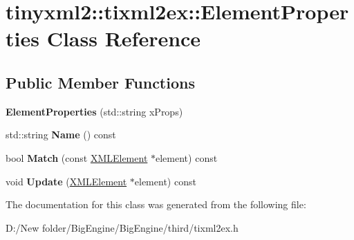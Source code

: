 \hypertarget{classtinyxml2_1_1tixml2ex_1_1_element_properties}{}\section{tinyxml2\+:\+:tixml2ex\+:\+:Element\+Properties Class Reference}
\label{classtinyxml2_1_1tixml2ex_1_1_element_properties}
\subsection*{Public Member Functions}
\begin{DoxyCompactItemize}
\item 
\mbox{\label{classtinyxml2_1_1tixml2ex_1_1_element_properties_ac52bf10b0fc1eaf2f588047ce05d2ecd}} 
{\bfseries Element\+Properties} (std\+::string x\+Props)
\item 
\mbox{\label{classtinyxml2_1_1tixml2ex_1_1_element_properties_aeac5293c72ee97e40fb70cd723f2ef0c}} 
std\+::string {\bfseries Name} () const
\item 
\mbox{\label{classtinyxml2_1_1tixml2ex_1_1_element_properties_a844601cb6d8d2f93b62a93abc8e0ae4c}} 
bool {\bfseries Match} (const \mbox{\hyperlink{classtinyxml2_1_1_x_m_l_element}{X\+M\+L\+Element}} $\ast$element) const
\item 
\mbox{\label{classtinyxml2_1_1tixml2ex_1_1_element_properties_a08e3c503f8874488f336315b1d187ce1}} 
void {\bfseries Update} (\mbox{\hyperlink{classtinyxml2_1_1_x_m_l_element}{X\+M\+L\+Element}} $\ast$element) const
\end{DoxyCompactItemize}


The documentation for this class was generated from the following file\+:\begin{DoxyCompactItemize}
\item 
D\+:/\+New folder/\+Big\+Engine/\+Big\+Engine/third/tixml2ex.\+h\end{DoxyCompactItemize}
